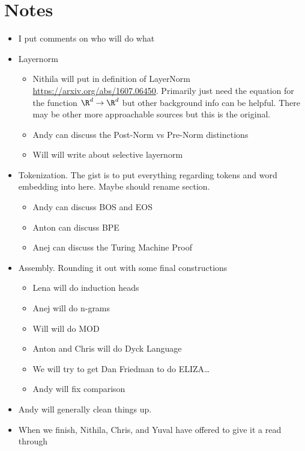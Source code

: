 \documentclass{article}
\begin{document}
\section{Notes}
\begin{itemize}
    \item I put comments on who will do what
    \item Layernorm
        \begin{itemize}
            \item Nithila will put in definition of LayerNorm \url{https://arxiv.org/abs/1607.06450}. Primarily just need the equation for the function $\R^d\to\R^d$ but other background info can be helpful. There may be other more approachable sources but this is the original.
            \item Andy can discuss the Post-Norm vs Pre-Norm distinctions
            \item Will will write about selective layernorm
        \end{itemize}
    \item Tokenization. The gist is to put everything regarding tokens and word embedding into here. Maybe should rename section.
        \begin{itemize}
            \item Andy can discuss BOS and EOS
            \item Anton can discuss BPE
            \item Anej can discuss the Turing Machine Proof
        \end{itemize}
    \item Assembly. Rounding it out with some final constructions
        \begin{itemize}
            \item Lena will do induction heads
            \item Anej will do n-grams
            \item Will will do MOD
            \item Anton and Chris will do Dyck Language
            \item We will try to get Dan Friedman to do ELIZA\ldots
            \item Andy will fix comparison
        \end{itemize}
    \item Andy will generally clean things up.
    \item When we finish, Nithila, Chris, and Yuval have offered to give it a read through
\end{itemize}



\end{document}
